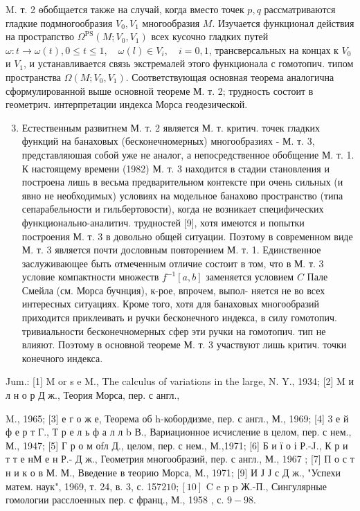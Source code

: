 \documentclass[10pt]{article}
\begin{document}
M. т. 2 өбобщается также на случай, когда вместо точек $p, q$ рассматриваются гладкие подмногообразия $V_{0}, V_{1}$ многообразия $M$. Изучается функционал действия на прострапство $\Omega^{\mathrm{PS}}\left(M ; V_{0}, V_{1}\right)$ всех кусочно гладких путей $\omega: t \rightarrow \omega(t), 0 \leqslant t \leqslant 1, \quad \omega(l) \in V_{i}, \quad i=0,1$, трансверсальных на концах к $V_{0}$ и $V_{1}$, и устанавливается связь экстремалей этого функционала с гомотопич. типом пространства $\Omega\left(M ; V_{0}, V_{1}\right)$. Соответствующая основная теорема аналогична сформулированной выше основной теореме М. т. 2; трудность состоит в геометрич. интерпретации индекса Морса геодезической.



\begin{enumerate}

  \setcounter{enumi}{2}

  \item Естественным развитнем М. т. 2 является М. т. критич. точек гладких функций на банаховых (бесконечномерных) многообразиях - М. т. 3, представляюшая собой уже не аналог, а непосредственное обобщение М. т. 1. К настоящему времени (1982) М. т. 3 находится в стадии становления и построена лишь в весьма предварительном контексте при очень сильных (и явно не необходимых) условиях на модельное банахово пространство (типа сепарабельности и гильбертовости), когда не возникает специфических функционально-аналитич. трудностей [9], хотя имеются и попытки построения М. т. 3 в довольно общей ситуации. Поэтому в современном виде М. т. 3 является почти дословным повторением М. т. 1. Единственное заслуживающее быть отмеченным отличие состоит в том, что в М. т. 3 условие компактности множеств $f^{-1}[a, b]$ заменяется условием $C$ Пале Смейла (см. Морса бучнция), к-рое, впрочем, выпол- няется не во всех интересных ситуациях. Кроме того, хотя для банаховых многообразий приходится приклеивать и ручки бесконечного индекса, в силу гомотопич. тривиальности бесконечномерных сфер эти ручки на гомотопич. тип не влияют. Поэтому в основной теореме М. т. 3 участвуют лишь критич. точки конечного индекса.

\end{enumerate}



Jum.: [1] M or s e M., The calculus of variations in the large, N. Y., 1934; [2] M и л н о р Д ж., Теория Морса, пер. с англ.,

M., 1965; [3] е г о ж е, Теорема об h-кобордизме, пер. с англ., М., 1969; [4] 3 е й ф е р т Г., Т р е л ь ф а л л b В., Вариационное исчисление в целом, пер. с нем., М., 1947; [5] Г р о м оfл Д., целом, пер. с нем., М.,1971; [6] Б и ї о і Р.-J., К р и т т е нМ е н Р.- Д ж., Геометрия многообразий, пер. с англ., М., 1967 ; [7] П о с т н и к о в М. М., Введение в теорию Морса, М., 1971; [9] И Ј Ј с Д ж., "Успехи матем. наук", 1969, т. 24, в. 3, с. 157$210 ;[10]$ C e p p Ж.-П., Сингулярные гомологии расслоенных пер. с франц., М., 1958 , с. $9-98$.
\end{document}
